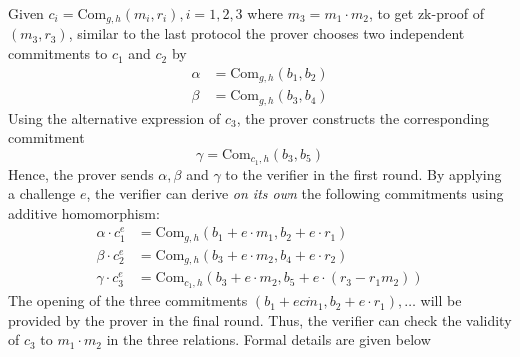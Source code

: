 \documentclass{article}
\begin{document}
Given $c_i = \text{Com}_{g, h}(m_i, r_i), i = 1, 2, 3$ where $m_3 = m_1 \cdot m_2$, to get zk-proof of $(m_3, r_3)$, similar to the last protocol the prover chooses two independent commitments to $c_1$ and $c_2$ by
\begin{equation*}
\begin{split}
\alpha & = \text{Com}_{g, h}(b_1, b_2) \\
\beta & = \text{Com}_{g, h}(b_3, b_4)
\end{split}
\end{equation*}
Using the alternative expression of $c_3$, the prover constructs the corresponding commitment
\begin{equation*}
\gamma = \text{Com}_{c_1, h}(b_3, b_5)
\end{equation*}
Hence, the prover sends $\alpha, \beta$ and $\gamma$ to the verifier in the first round. By applying a challenge $e$, the verifier can derive \textit{on its own} the following commitments using additive homomorphism:
\begin{equation*}
\begin{split}
\alpha \cdot c_1^e & = \text{Com}_{g, h}(b_1 + e \cdot m_1 , b_2 + e \cdot r_1) \\
\beta \cdot c_{2}^e & = \text{Com}_{g, h}(b_{3} + e \cdot m_2 , b_4 + e \cdot r_2) \\
\gamma \cdot c_3^e & = \text{Com}_{c_1, h}(b_{3} + e \cdot m_{2} , b_{5} + e \cdot (r_3 - r_1 m_2))
\end{split}
\end{equation*}
The opening of the three commitments $(b_1 + e c\dot m_1, b_2 + e \cdot r_1), \dots $ will be provided by the prover in the final round. Thus, the verifier can check the validity of $c_3$ to $m_1 \cdot m_2$ in the three relations. Formal details are given below
\end{document}
